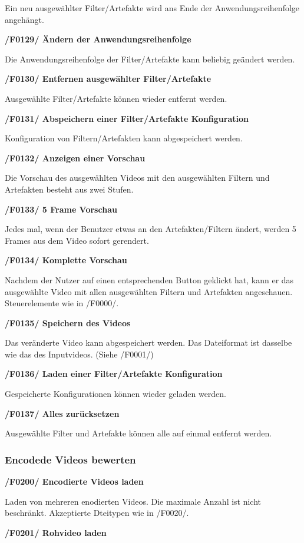 \documentclass[parskip=full]{scrartcl}
\begin{document}
Ein neu ausgewählter Filter/Artefakte wird ans Ende der Anwendungsreihenfolge angehängt.

\textbf{/F0129/ Ändern der Anwendungsreihenfolge}

Die Anwendungsreihenfolge der Filter/Artefakte kann beliebig geändert werden.

\textbf{/F0130/ Entfernen ausgewählter Filter/Artefakte}

Ausgewählte Filter/Artefakte können wieder entfernt werden.

\textbf{/F0131/ Abspeichern einer Filter/Artefakte Konfiguration}

Konfiguration von Filtern/Artefakten kann abgespeichert werden.

\textbf{/F0132/ Anzeigen einer Vorschau}

Die Vorschau des ausgewählten Videos mit den ausgewählten Filtern und Artefakten besteht aus zwei Stufen.

\textbf{/F0133/ 5 Frame Vorschau}

Jedes mal, wenn der Benutzer etwas an den Artefakten/Filtern ändert, werden 5 Frames aus dem Video sofort gerendert.

\textbf{/F0134/ Komplette Vorschau}

Nachdem der Nutzer auf einen entsprechenden Button geklickt hat, kann er das ausgewählte Video mit allen ausgewählten Filtern und Artefakten angeschauen. Steuerelemente wie in /F0000/.

\textbf{/F0135/ Speichern des Videos}

Das veränderte Video kann abgespeichert werden. Das Dateiformat ist dasselbe wie das des Inputvideos. (Siehe /F0001/)

\textbf{/F0136/ Laden einer Filter/Artefakte Konfiguration}

Gespeicherte Konfigurationen können wieder geladen werden.

\textbf{/F0137/ Alles zurücksetzen}

Ausgewählte Filter und Artefakte können alle auf einmal entfernt werden.
\subsubsection{Encodede Videos bewerten}
\textbf{/F0200/ Encodierte Videos laden}

Laden von mehreren enodierten Videos. Die maximale Anzahl ist nicht beschränkt. Akzeptierte Dteitypen wie in /F0020/.

\textbf{/F0201/ Rohvideo laden}
\end{document}
